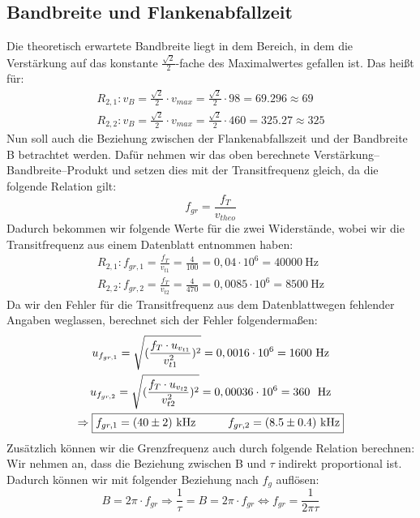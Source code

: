 \subsection*{Bandbreite und Flankenabfallzeit}
Die theoretisch erwartete Bandbreite liegt in dem Bereich, in dem die Verstärkung auf das konstante $\frac{\sqrt{2}}{2}$-fache des Maximalwertes gefallen ist. Das heißt für:
\begin{gather}
    R_{2,1}: v_B=\frac{\sqrt{2}}{2}\cdot v_{max}=\frac{\sqrt{2} }{2}\cdot 98=69.296\approx 69\\
    R_{2,2}: v_B=\frac{\sqrt{2}}{2}\cdot v_{max}=\frac{\sqrt{2}}{2}\cdot460 =325.27\approx 325
\end{gather}
Nun soll auch die Beziehung zwischen der Flankenabfallszeit und der Bandbreite B betrachtet werden. Dafür nehmen wir das oben berechnete Verstärkung–Bandbreite–Produkt und setzen dies mit der Transitfrequenz gleich, da die folgende Relation gilt:
\begin{equation}
    f_{gr}=\frac{f_T}{v_{theo}}
\end{equation}
Dadurch bekommen wir folgende Werte für die zwei Widerstände, wobei wir die Transitfrequenz aus einem Datenblatt entnommen haben:
\begin{gather}
    R_{2,1}: f_{gr,1}=\frac{f_T}{v_{t1}}=\frac{4}{100}=0,04\cdot 10^6=40000~\text{Hz}\\
    R_{2,2}: f_{gr,2}=\frac{f_T}{v_{t2}}=\frac{4}{470}=0,0085\cdot 10^6=8500~\text{Hz}
\end{gather}
Da wir den Fehler für die Transitfrequenz aus dem Datenblatt\footnotemark[1] wegen fehlender Angaben weglassen, berechnet sich der Fehler folgendermaßen:
\begin{gather}
    u_{f_{gr,1}}=\sqrt{(\frac{f_T \cdot u_{v_{t1}}}{v_{t1}^2})^2}=0,0016\cdot 10^6=1600~\text{Hz}\\
    u_{f_{gr,2}}=\sqrt{(\frac{f_T \cdot u_{v_{t2}}}{v_{t2}^2})^2}=0,00036\cdot 10^6=360~~\text{Hz}\\
    \Rightarrow \boxed{f_{gr,1}=(40\pm2)~\text{kHz} \tab f_{gr,2}=(8.5\pm0.4)~\text{kHz}}
\end{gather}
Zusätzlich können wir die Grenzfrequenz auch durch folgende Relation berechnen: Wir nehmen an, dass die Beziehung zwischen B und $\tau$ indirekt proportional ist. Dadurch können wir mit folgender Beziehung nach $f_g$ auflösen:
\begin{equation}
    B=2\pi\cdot f_{gr} \Rightarrow \frac{1}{\tau}=B=2\pi\cdot f_{gr} \Leftrightarrow  f_{gr}=\frac{1}{2\pi \tau}
\end{equation}
